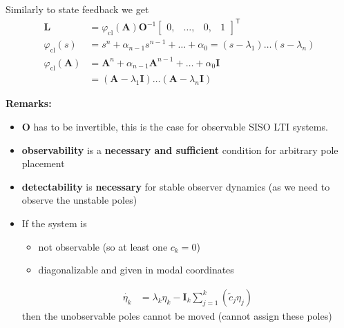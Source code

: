 
Similarly to state feedback we get
\begin{align*}
    \mathbf{L}                        & =\varphi_{\mathrm{cl}}(\mathbf{A})\mathbf{O}^{-1}\begin{bmatrix}
                                                                                             0, & \ldots, & 0, & 1
                                                                                         \end{bmatrix}^{\mathsf{T}}     \\
    \varphi_{\mathrm{cl}}(s)          & =s^n+\alpha_{n-1}s^{n-1}+\ldots+\alpha_0=(s-\lambda_1)\ldots(s-\lambda_n)  \\
    \varphi_{\mathrm{cl}}(\mathbf{A}) & =\mathbf{A}^n+\alpha_{n-1}\mathbf{A}^{n-1}+\ldots+\alpha_0 \mathbf{I}      \\
                                      & = (\mathbf{A}-\lambda_1 \mathbf{I})\ldots(\mathbf{A}-\lambda_n \mathbf{I})
\end{align*}

\textbf{Remarks:}
\begin{itemize}
    \item $\mathbf{O}$ has to be invertible, this is the case for observable SISO LTI systems.
    \item \textbf{observability} is a \textbf{necessary and sufficient} condition for arbitrary pole placement
    \item \textbf{detectability} is \textbf{necessary} for stable observer dynamics (as we need to observe the unstable poles)
    \item If the system is
          \begin{itemize}
              \item not observable (so at least one $c_k=0$)
              \item diagonalizable and given in modal coordinates
          \end{itemize}
          \begin{align*}
              \dot{\eta_k} & =\lambda_k\eta_k-\mathbf{I}_k\sum_{j=1}^k\left(\tilde{c}_j\eta_j\right)
          \end{align*}
          then the unobservable poles cannot be moved (cannot assign these poles)
\end{itemize}

\newpar{}


